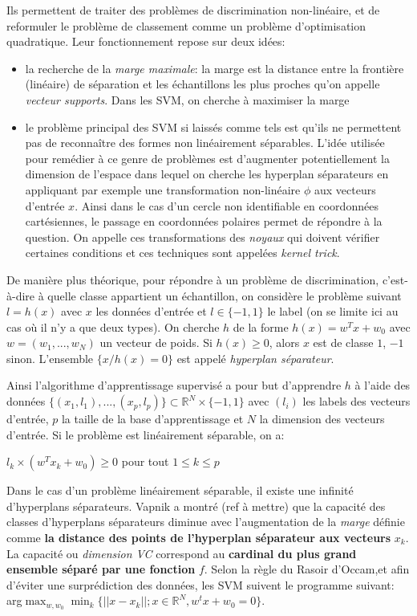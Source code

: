 \documentclass{article}
\theoremstyle{definition}
\newcommand{\R}{\mathbb R}
\begin{document}
\noindent Ils permettent de traiter des problèmes de discrimination non-linéaire, et de reformuler le problème de classement comme un problème d'optimisation quadratique. Leur fonctionnement repose sur deux idées:
\begin{itemize}
\item la recherche de la \textit{marge maximale}: la marge est la distance entre la frontière (linéaire) de séparation et les échantillons les plus proches qu'on appelle \textit{vecteur supports}. Dans les SVM, on cherche à maximiser la marge
\item le problème principal des SVM si laissés comme tels est qu'ils ne permettent pas de reconnaître des formes non linéairement séparables. L'idée utilisée pour remédier à ce genre de problèmes est d'augmenter potentiellement la dimension de l'espace dans lequel on cherche les hyperplan séparateurs en appliquant par exemple une transformation non-linéaire $\phi$ aux vecteurs d'entrée $x$. Ainsi dans le cas d'un cercle non identifiable en coordonnées cartésiennes, le passage en coordonnées polaires permet de répondre à la question. On appelle ces transformations des \textit{noyaux} qui doivent vérifier certaines conditions et ces techniques sont appelées \textit{kernel trick}.
\end{itemize}

\noindent De manière plus théorique, pour répondre à un problème de discrimination, c'est-à-dire à quelle classe appartient un échantillon, on considère le problème suivant $l=h(x)$ avec $x$ les données d'entrée et $l\in \{-1,1\}$ le label (on se limite ici au cas où il n'y a que deux types). On cherche $h$ de la forme $h(x)=w^Tx+w_0$ avec $w=(w_1,...,w_N)$ un vecteur de poids. Si $h(x)\geq0$, alors $x$ est de classe $1$, $-1$ sinon. L'ensemble $\{x/h(x)=0\}$ est appelé \textit{hyperplan séparateur}.

\noindent Ainsi l'algorithme d'apprentissage supervisé a pour but d'apprendre $h$ à l'aide des données $\{(x_1,l_1),...,(x_p,l_p)\}\subset \R^N\times\{-1,1\}$ avec $(l_i)$ les labels des vecteurs d'entrée, $p$ la taille de la base d'apprentissage et $N$ la dimension des vecteurs d'entrée. Si le problème est linéairement séparable, on a:

$l_k\times \left(w^T x_k+w_0\right)\geq 0$ pour tout $1\leq k \leq p$

\noindent Dans le cas d'un problème linéairement séparable, il existe une infinité d'hyperplans séparateurs. Vapnik a montré (ref à mettre) que la capacité des classes d'hyperplans séparateurs diminue avec l'augmentation de la \textit{marge} définie comme \textbf{la distance des points de l'hyperplan séparateur aux vecteurs} $x_k$. La capacité ou \textit{dimension VC} correspond au \textbf{cardinal du plus grand ensemble séparé par une fonction} $f$. Selon la règle du Rasoir d'Occam,et afin d'éviter une surprédiction des données, les SVM suivent le programme suivant:
arg$\displaystyle\max_{w,w_0}\min_k\{||x-x_k||;x\in \R^N,w^tx+w_0=0\}$.
\end{document}
